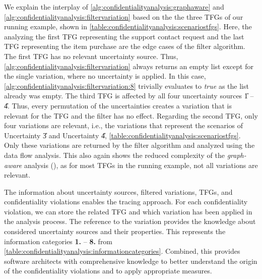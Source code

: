 We explain the interplay of \autoref{alg:confidentialityanalysis:graphaware} and \autoref{alg:confidentialityanalysis:filtervariation} based on the the three \acp{TFG} of our running example, shown in \autoref{table:confidentialityanalysis:scenariostfgs}.
Here, the analyzing the first \ac{TFG} representing the support contact request and the last \ac{TFG} representing the item purchase are the edge cases of the filter algorithm.
The first \ac{TFG} has no relevant uncertainty source.
Thus, \autoref{alg:confidentialityanalysis:filtervariation} always returns an empty list except for the single variation, where no uncertainty is applied.
In this case, \autoref{alg:confidentialityanalysis:filtervariation:8} trivially evaluates to \emph{true} as the list already was empty.
The third \ac{TFG} is affected by all four uncertainty sources \U{1} -- \U{4}.
Thus, every permutation of the uncertainties creates a variation that is relevant for the \ac{TFG} and the filter has no effect.
Regarding the second \ac{TFG}, only four variations are relevant, i.e., the variations that represent the scenarios of Uncertainty \U{3} and Uncertainty \U{4}, \autoref{table:confidentialityanalysis:scenariostfgs}.
Only these variations are returned by the filter algorithm and analyzed using the data flow analysis.
This also again shows the reduced complexity of the \emph{graph-aware} analysis (), as for most \acp{TFG} in the running example, not all variations are relevant.

The information about uncertainty sources, filtered variations, \acp{TFG}, and confidentiality violations enables the tracing approach.
For each confidentiality violation, we can store the related \ac{TFG} and which variation has been applied in the analysis process.
The reference to the variation provides the knowledge about considered uncertainty sources and their properties.
This represents the information categories \textbf{1.} -- \textbf{8.} from \autoref{table:confidentialityanalysis:informationcategories}.
Combined, this provides software architects with comprehensive knowledge to better understand the origin of the confidentiality violations and to apply appropriate measures.


